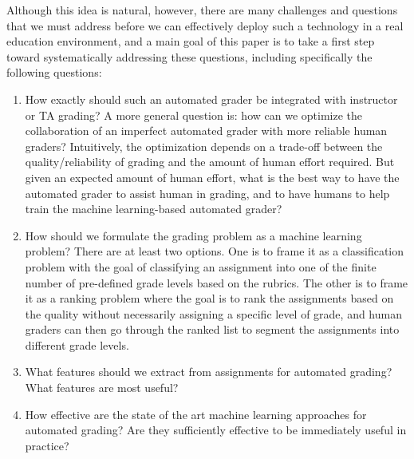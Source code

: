 Although this idea is natural, however, there are many challenges and
questions that we must address before we can effectively deploy such a
technology in a real education environment, and a main goal of this paper
is to take a first step toward systematically addressing these questions,
including specifically the following questions:

\begin{enumerate}
\item How exactly should such an automated grader be integrated with
 instructor or TA grading? A more general question is: how can we optimize
 the collaboration of an imperfect automated grader with more reliable
 human graders? Intuitively, the optimization depends on a trade-off between
 the quality/reliability of grading and the amount of human effort
 required. But given an expected amount of human effort, what is the best
 way to have the automated grader to assist human in grading, and to have
 humans to help train the machine learning-based automated grader?

\item How should we formulate the grading problem as a machine learning
 problem? There are at least two options. One is to frame it as a
 classification problem with the goal of classifying an assignment into one
 of the finite number of pre-defined grade levels based on the rubrics. The
 other is to frame it as a ranking problem where the goal is to rank the
 assignments based on the quality without necessarily assigning a specific
 level of grade, and human graders can then go through the ranked list to
 segment the assignments into different grade levels.

\item What features should we extract from assignments for automated
 grading? What features are most useful?

\item How effective are the state of the art machine learning approaches
 for automated grading? Are they sufficiently effective to be immediately
 useful in practice?
\end{enumerate}

